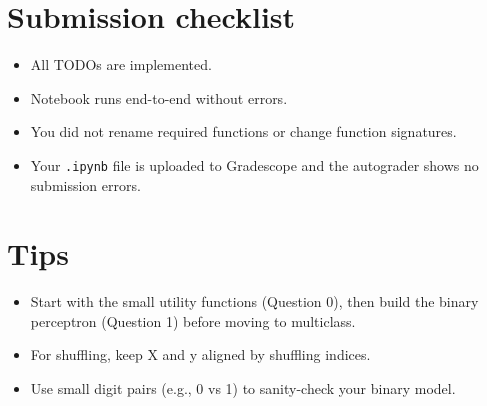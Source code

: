 \documentclass[11pt]{article}
\begin{document}
\section*{Submission checklist}
\begin{itemize}[leftmargin=1.25em]
  \item All TODOs are implemented.
  \item Notebook runs end-to-end without errors.
  \item You did not rename required functions or change function signatures.
  \item Your \texttt{.ipynb} file is uploaded to Gradescope and the autograder shows no submission errors.
\end{itemize}

\section*{Tips}
\begin{itemize}[leftmargin=1.25em]
  \item Start with the small utility functions (Question 0), then build the binary
  perceptron (Question 1) before moving to multiclass.
  \item For shuffling, keep X and y aligned by shuffling indices.
  \item Use small digit pairs (e.g., 0 vs 1) to sanity-check your binary model.
\end{itemize}
\end{document}
